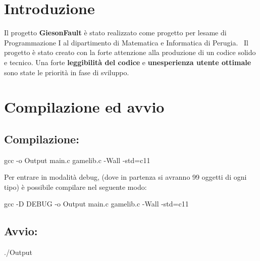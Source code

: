 \hypertarget{index_intro_sec}{}\section{Introduzione}\label{index_intro_sec}
Il progetto {\bfseries Gieson\+Fault} è stato realizzato come progetto per l\textquotesingle{}esame di Programmazione I al dipartimento di Matematica e Informatica di Perugia.~\newline
 Il progetto è stato creato con la forte attenzione alla produzione di un codice solido e tecnico. Una forte {\bfseries leggibilità del codice} e {\bfseries un\textquotesingle{}esperienza utente ottimale} sono state le priorità in fase di sviluppo.\hypertarget{index_run_sec}{}\section{Compilazione ed avvio}\label{index_run_sec}
\hypertarget{index_compilation}{}\subsection{Compilazione\+:}\label{index_compilation}

\begin{DoxyCode}
gcc -o Output main.c gamelib.c -Wall -std=c11
\end{DoxyCode}


Per entrare in modalità debug, (dove in partenza si avranno 99 oggetti di ogni tipo) è possibile compilare nel seguente modo\+: 
\begin{DoxyCode}
gcc -D DEBUG -o Output main.c gamelib.c -Wall -std=c11
\end{DoxyCode}
\hypertarget{index_run}{}\subsection{Avvio\+:}\label{index_run}

\begin{DoxyCode}
./Output
\end{DoxyCode}
 